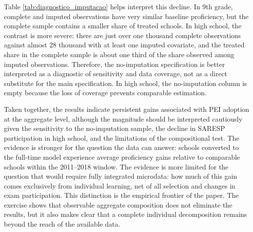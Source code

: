 

Table \ref{tab:diagnostico_imputacao} helps interpret this decline. In 9th grade, complete and imputed observations have very similar baseline proficiency, but the complete sample contains a smaller share of treated schools. In high school, the contrast is more severe: there are just over one thousand complete observations against almost 28 thousand with at least one imputed covariate, and the treated share in the complete sample is about one third of the share observed among imputed observations. Therefore, the no-imputation specification is better interpreted as a diagnostic of sensitivity and data coverage, not as a direct substitute for the main specification. In high school, the no-imputation column is empty because the loss of coverage prevents comparable estimation.

Taken together, the results indicate persistent gains associated with PEI adoption at the aggregate level, although the magnitude should be interpreted cautiously given the sensitivity to the no-imputation sample, the decline in SARESP participation in high school, and the limitations of the compositional test. The evidence is stronger for the question the data can answer: schools converted to the full-time model experience average proficiency gains relative to comparable schools within the 2011--2018 window. The evidence is more limited for the question that would require fully integrated microdata: how much of this gain comes exclusively from individual learning, net of all selection and changes in exam participation. This distinction is the empirical frontier of the paper. The exercise shows that observable aggregate composition does not eliminate the results, but it also makes clear that a complete individual decomposition remains beyond the reach of the available data.
